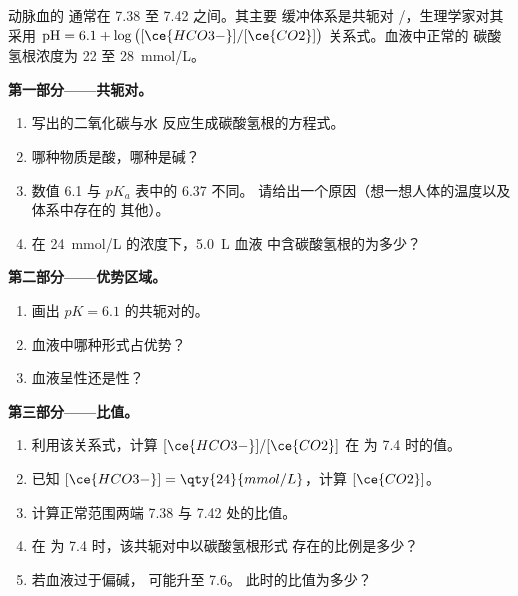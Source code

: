 \begin{problem}
\label{pb:g12:buffers-predominance:1}
动脉血的  通常在 7.38 至 7.42 之间。其主要
缓冲体系是共轭对 /，生理学家对其采用
$\mathrm{pH} = 6.1 + \log\big([\ce{HCO3-}]/[\ce{CO2}]\big)$ 关系式。血液中正常的
碳酸氢根浓度为 22 至 \qty{28}{mmol/L}。

\medskip
\noindent\textbf{第一部分——共轭对。}
\begin{enumerate}
  \item 写出的二氧化碳与水
        反应生成碳酸氢根的方程式。
  \item 哪种物质是酸，哪种是碱？
  \item 数值 6.1 与 $pK_a$ 表中的 6.37 不同。
        请给出一个原因（想一想人体的温度以及体系中存在的
        其他）。
  \item 在 \qty{24}{mmol/L} 的浓度下，\qty{5.0}{L} 血液
        中含碳酸氢根的为多少？
\end{enumerate}

\medskip
\noindent\textbf{第二部分——优势区域。}
\begin{enumerate}[resume]
  \item 画出 $pK = 6.1$ 的共轭对的。
  \item 血液中哪种形式占优势？
  \item 血液呈性还是性？
\end{enumerate}

\medskip
\noindent\textbf{第三部分——比值。}
\begin{enumerate}[resume]
  \item 利用该关系式，计算 $[\ce{HCO3-}]/[\ce{CO2}]$
        在  为 7.4 时的值。
  \item 已知 $[\ce{HCO3-}] = \qty{24}{mmol/L}$，计算 $[\ce{CO2}]$。
  \item 计算正常范围两端 7.38 与
        7.42 处的比值。
  \item 在  为 7.4 时，该共轭对中以碳酸氢根形式
        存在的比例是多少？
  \item 若血液过于偏碱， 可能升至 7.6。
        此时的比值为多少？
\end{enumerate}


\end{problem}
